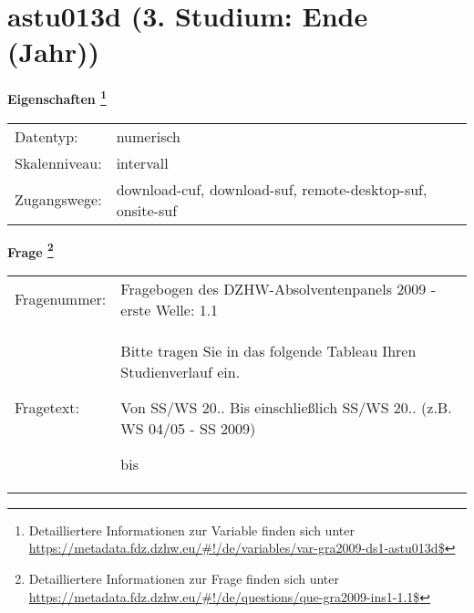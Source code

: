 
    \setcounter{footnote}{0}

    \vspace*{-1.8cm}
	\section{astu013d (3. Studium: Ende (Jahr))}
	\label{section:astu013d}



    \vspace*{0.5cm}
    \noindent\textbf{Eigenschaften
	\footnote{Detailliertere Informationen zur Variable finden sich unter
		\url{https://metadata.fdz.dzhw.eu/\#!/de/variables/var-gra2009-ds1-astu013d$}}}\\
	\begin{tabularx}{\hsize}{@{}lX}
	Datentyp: & numerisch \\
	Skalenniveau: & intervall \\
	Zugangswege: &
	  download-cuf, 
	  download-suf, 
	  remote-desktop-suf, 
	  onsite-suf
 \\
    \end{tabularx}



				\vspace*{0.5cm}
                \noindent\textbf{Frage
	                \footnote{Detailliertere Informationen zur Frage finden sich unter
		              \url{https://metadata.fdz.dzhw.eu/\#!/de/questions/que-gra2009-ins1-1.1$}}}\\
				\begin{tabularx}{\hsize}{@{}lX}
					Fragenummer: &
					  Fragebogen des DZHW-Absolventenpanels 2009 - erste Welle:
					  1.1
 \\
					Fragetext: & Bitte tragen Sie in das folgende Tableau Ihren Studienverlauf ein.\par  Von SS/WS 20.. Bis einschließlich SS/WS 20.. (z.B. WS 04/05 - SS 2009)\par  bis \\
				\end{tabularx}





